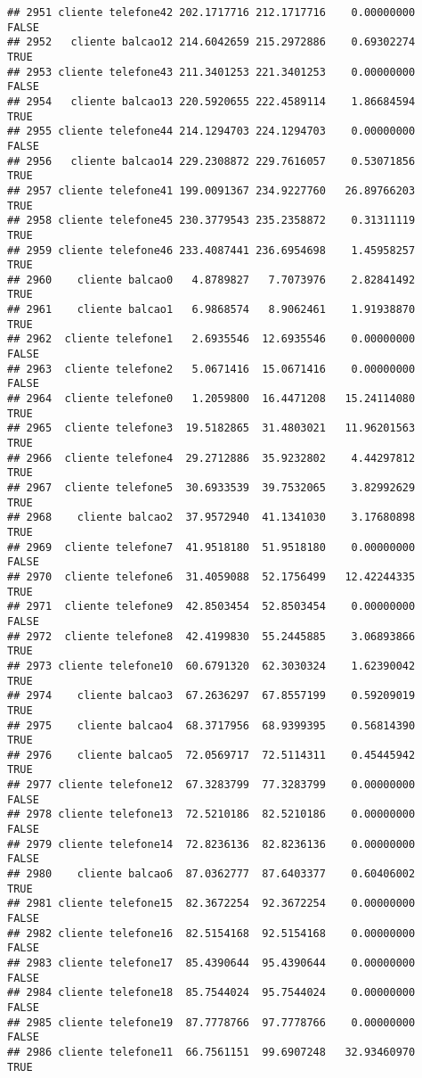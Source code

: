\documentclass[
]{article}
\begin{document}
\begin{verbatim}
## 2951 cliente telefone42 202.1717716 212.1717716    0.00000000    FALSE
## 2952   cliente balcao12 214.6042659 215.2972886    0.69302274     TRUE
## 2953 cliente telefone43 211.3401253 221.3401253    0.00000000    FALSE
## 2954   cliente balcao13 220.5920655 222.4589114    1.86684594     TRUE
## 2955 cliente telefone44 214.1294703 224.1294703    0.00000000    FALSE
## 2956   cliente balcao14 229.2308872 229.7616057    0.53071856     TRUE
## 2957 cliente telefone41 199.0091367 234.9227760   26.89766203     TRUE
## 2958 cliente telefone45 230.3779543 235.2358872    0.31311119     TRUE
## 2959 cliente telefone46 233.4087441 236.6954698    1.45958257     TRUE
## 2960    cliente balcao0   4.8789827   7.7073976    2.82841492     TRUE
## 2961    cliente balcao1   6.9868574   8.9062461    1.91938870     TRUE
## 2962  cliente telefone1   2.6935546  12.6935546    0.00000000    FALSE
## 2963  cliente telefone2   5.0671416  15.0671416    0.00000000    FALSE
## 2964  cliente telefone0   1.2059800  16.4471208   15.24114080     TRUE
## 2965  cliente telefone3  19.5182865  31.4803021   11.96201563     TRUE
## 2966  cliente telefone4  29.2712886  35.9232802    4.44297812     TRUE
## 2967  cliente telefone5  30.6933539  39.7532065    3.82992629     TRUE
## 2968    cliente balcao2  37.9572940  41.1341030    3.17680898     TRUE
## 2969  cliente telefone7  41.9518180  51.9518180    0.00000000    FALSE
## 2970  cliente telefone6  31.4059088  52.1756499   12.42244335     TRUE
## 2971  cliente telefone9  42.8503454  52.8503454    0.00000000    FALSE
## 2972  cliente telefone8  42.4199830  55.2445885    3.06893866     TRUE
## 2973 cliente telefone10  60.6791320  62.3030324    1.62390042     TRUE
## 2974    cliente balcao3  67.2636297  67.8557199    0.59209019     TRUE
## 2975    cliente balcao4  68.3717956  68.9399395    0.56814390     TRUE
## 2976    cliente balcao5  72.0569717  72.5114311    0.45445942     TRUE
## 2977 cliente telefone12  67.3283799  77.3283799    0.00000000    FALSE
## 2978 cliente telefone13  72.5210186  82.5210186    0.00000000    FALSE
## 2979 cliente telefone14  72.8236136  82.8236136    0.00000000    FALSE
## 2980    cliente balcao6  87.0362777  87.6403377    0.60406002     TRUE
## 2981 cliente telefone15  82.3672254  92.3672254    0.00000000    FALSE
## 2982 cliente telefone16  82.5154168  92.5154168    0.00000000    FALSE
## 2983 cliente telefone17  85.4390644  95.4390644    0.00000000    FALSE
## 2984 cliente telefone18  85.7544024  95.7544024    0.00000000    FALSE
## 2985 cliente telefone19  87.7778766  97.7778766    0.00000000    FALSE
## 2986 cliente telefone11  66.7561151  99.6907248   32.93460970     TRUE

\end{verbatim}
\end{document}
